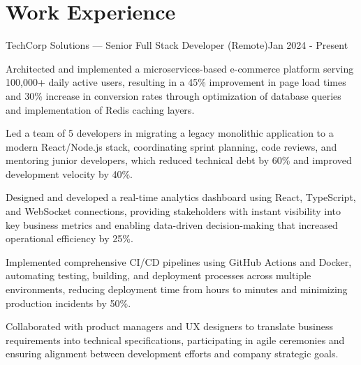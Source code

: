 
\section{Work Experience}

\begin{joblong}{TechCorp Solutions --- Senior Full Stack Developer (Remote)}{Jan 2024 - Present}
\item Architected and implemented a microservices-based e-commerce platform serving 100,000+ daily active users, resulting in a 45\% improvement in page load times and 30\% increase in conversion rates through optimization of database queries and implementation of Redis caching layers.
\item Led a team of 5 developers in migrating a legacy monolithic application to a modern React/Node.js stack, coordinating sprint planning, code reviews, and mentoring junior developers, which reduced technical debt by 60\% and improved development velocity by 40\%.
\item Designed and developed a real-time analytics dashboard using React, TypeScript, and WebSocket connections, providing stakeholders with instant visibility into key business metrics and enabling data-driven decision-making that increased operational efficiency by 25\%.
\item Implemented comprehensive CI/CD pipelines using GitHub Actions and Docker, automating testing, building, and deployment processes across multiple environments, reducing deployment time from hours to minutes and minimizing production incidents by 50\%.
\item Collaborated with product managers and UX designers to translate business requirements into technical specifications, participating in agile ceremonies and ensuring alignment between development efforts and company strategic goals.
\end{joblong}


